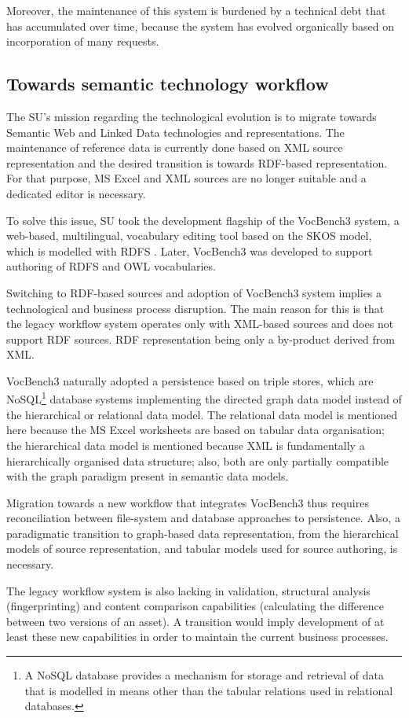 	Moreover, the maintenance of this system is burdened by a technical debt that has accumulated over time, because the system has evolved organically based on incorporation of many requests. 
	

	\subsection{Towards semantic technology workflow}
	
	The SU's mission regarding the technological evolution is to migrate towards Semantic Web and Linked Data technologies and representations. The maintenance of reference data is currently done based on XML source representation and the desired transition is towards RDF-based representation. For that purpose, MS Excel and XML sources are no longer suitable and a dedicated editor is necessary.
	
	To solve this issue, SU took the development flagship of the VocBench3 \citep{stellatovocbench} system, a web-based, multilingual, vocabulary editing tool based on the SKOS \citep{skos-spec} model, which is modelled with RDFS \citep{rdfs1-spec,rdfs11-spec}. Later, VocBench3 was developed to support authoring of RDFS and OWL vocabularies.
	
	Switching to RDF-based sources and adoption of VocBench3 system implies a technological and business process disruption. The main reason for this is that the legacy workflow system operates only with XML-based sources and does not support RDF sources. RDF representation being only a by-product derived from XML. 
	
	VocBench3 naturally adopted a persistence based on triple stores, which are NoSQL\footnote{A NoSQL database provides a mechanism for storage and retrieval of data that is modelled in means other than the tabular relations used in relational databases.} database systems implementing the directed graph data model instead of the hierarchical or relational data model. The relational data model is mentioned here because the MS Excel worksheets are based on tabular data organisation; the hierarchical data model is mentioned because XML is fundamentally a hierarchically organised data structure; also, both are only partially compatible with the graph paradigm present in semantic data models. 
	
	Migration towards a new workflow that integrates VocBench3 thus requires reconciliation between file-system and database approaches to persistence. Also, a paradigmatic transition to graph-based data representation, from the hierarchical models of source representation, and tabular models used for source authoring, is necessary.
	 
	The legacy workflow system is also lacking in validation, structural analysis (fingerprinting) and content comparison capabilities (calculating the difference between two versions of an asset). A transition would imply development of at least these new capabilities in order to maintain the current business processes. 
	
